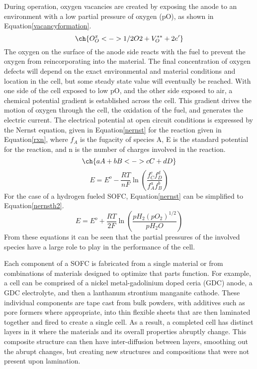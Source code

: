 During operation, oxygen vacancies are created by exposing the anode to an environment with a low partial pressure of oxygen (pO), as shown in Equation\ref{vacancyformation}.
\begin{equation} \label{vacancyformation}
\ch{O_O^x  <-> 1/2 O2 + V_O^{**} + 2 e'}
\end{equation}
The oxygen on the surface of the anode side reacts with the fuel to prevent the oxygen from reincorporating into the material.
The final concentration of oxygen defects will depend on the exact environmental and material conditions and location in the cell, but some steady state value will eventually be reached.
With one side of the cell exposed to low pO, and the other side exposed to air, a chemical potential gradient is established across the cell.
This gradient drives the motion of oxygen through the cell, the oxidation of the fuel, and generates the electric current.
The electrical potential at open circuit conditions is expressed by the Nernst equation, given in Equation\ref{nernst} for the reaction given in Equation\ref{rxn}, where \(f_A\) is the fugacity of species A, E is the standard potential for the reaction, and n is the number of charges involved in the reaction.\cite{Larminie2001}
\begin{equation}
  \label{rxn}
\ch{aA + bB  <-> cC + dD}
\end{equation}
\begin{equation}
  \label{nernst}
E = E^o - \frac{RT}{nF}\ln\left(\frac{f_C^c f_D^d}{f_A^a f_B^b}\right)
\end{equation}
For the case of a hydrogen fueled SOFC, Equation\ref{nernst} can be simplified to Equation\ref{nernsth2}.\cite{Pilatowsky2008}
\begin{equation}
  \label{nernsth2}
E = E^o + \frac{RT}{2F}\ln\left(\frac{pH_2 {(pO_2)}^{1/2}}{pH_2 O}\right)
\end{equation}
From these equations it can be seen that the partial pressures of the involved species have a large role to play in the performance of the cell.

Each component of a SOFC is fabricated from a single material or from combinations of materials designed to optimize that parts function.
For example, a cell can be comprised of a nickel metal-gadolinium doped ceria (GDC) anode, a GDC electrolyte, and then a  lanthanum strontium manganite cathode.\cite{Liu2002,Haile2003}
These individual components are tape cast from bulk powders, with additives such as pore formers where appropriate, into thin flexible sheets that are then laminated together and fired to create a single cell.
As a result, a completed cell has distinct layers in it where the materials and its overall properties abruptly change.
This composite structure can then have inter-diffusion between layers, smoothing out the abrupt changes, but creating new structures and compositions that were not present upon lamination.\cite{Yokokawa2008}

